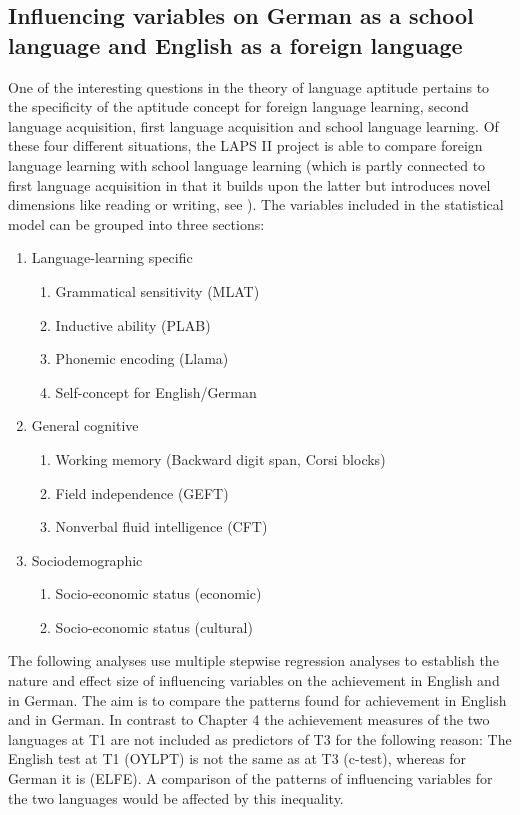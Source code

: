 \documentclass[output=paper]{langsci/langscibook}
\begin{document}
\subsection{Influencing variables on German as a school language and English as a foreign language}\label{sec:09:4.2}%

One of the interesting questions in the theory of language aptitude pertains to the specificity of the aptitude concept for foreign language learning, second language acquisition, first language acquisition and school language learning. Of these four different situations, the LAPS II project is able to compare foreign language learning with school language learning (which is partly connected to first language acquisition in that it builds upon the latter but introduces novel dimensions like reading or writing, see ). The variables included in the statistical model can be grouped into three sections:

\begin{enumerate}
\item Language-learning specific
   \begin{enumerate}[label=\alph*.]
   \item Grammatical sensitivity (MLAT)
   \item Inductive ability (PLAB)
   \item Phonemic encoding (Llama)
   \item Self-concept for English/German
   \end{enumerate}
\item General cognitive
   \begin{enumerate}[label=\alph*.]
   \item Working memory (Backward digit span, Corsi blocks)
   \item Field independence (GEFT)
   \item Nonverbal fluid intelligence (CFT)
   \end{enumerate}
\item Sociodemographic
   \begin{enumerate}[label=\alph*.]
   \item Socio-economic status (economic)
   \item Socio-economic status (cultural)
   \end{enumerate}
\end{enumerate}

The following analyses use multiple stepwise regression analyses to establish the nature and effect size of influencing variables on the achievement in English and in German. The aim is to compare the patterns found for achievement in English and in German. In contrast to Chapter 4 the achievement measures of the two languages at T1 are not included as predictors of T3 for the following reason: The English test at T1 (OYLPT) is not the same as at T3 (c-test), whereas for German it is (ELFE). A comparison of the patterns of influencing variables for the two languages would be affected by this inequality. 
\end{document}
